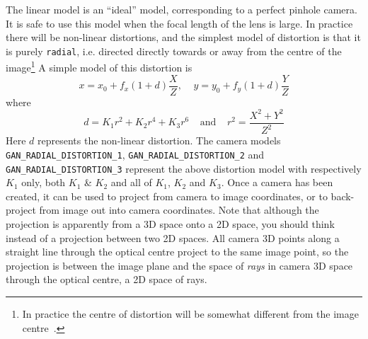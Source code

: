 The linear model is an ``ideal'' model, corresponding to a perfect pinhole
camera. It is safe to use this model when the focal length of the lens is
large. In practice there will be non-linear distortions, and the
simplest model of distortion is that it is purely {\tt radial},
i.e. directed directly towards or away from the centre of the
image\footnote{In practice the centre of distortion will be somewhat
different from the image centre~\cite{Slama:etal:PHOTOG80}.}
A simple model of this distortion is
\begin{equation}
 x = x_0 + f_x (1+d)\frac{X}{Z},\;\;\;\;y = y_0 + f_y (1+d)\frac{Y}{Z}
 \label{radial-distortion-model}
\end{equation}
where
\[ d = K_1 r^2 + K_2 r^4 + K_3 r^6\;\;\;\;\mbox{and}\;\;\;\;r^2 = \frac{X^2 + Y^2}{Z^2}
\]
Here $d$ represents the non-linear distortion. The camera models
{\tt GAN\_RADIAL\_DISTORTION\_1}, {\tt GAN\_RADIAL\_DISTORTION\_2}
and {\tt GAN\_RADIAL\_DISTORTION\_3}
represent the above distortion model with respectively $K_1$ only,
both $K_1$ \& $K_2$ and all of $K_1$, $K_2$ and $K_3$.
Once a camera has been created, it can be used to project from camera to
image coordinates, or to back-project from image out into camera coordinates.
Note that although the projection is apparently from a 3D space onto a
2D space, you should think instead of a projection between two 2D spaces.
All camera 3D points along a straight line through the optical centre
project to the same image point, so the projection is between the image
plane and the space of {\em rays} in camera 3D space through the optical
centre, a 2D space of rays.

